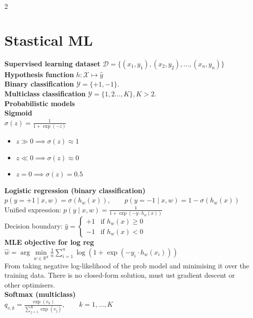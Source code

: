 \documentclass[10pt]{article}
\begin{document}
\small 

\raggedright

\begin{multicols*}{2}
\section*{Stastical ML}
\textbf{Supervised learning dataset}
$\mathcal{D} = \{(x_1, y_1), (x_2, y_2), \dots, (x_n, y_n)\}$\\
\textbf{Hypothesis function} $h : \mathcal{X} \mapsto \hat{y}$\\
\textbf{Binary classification} $\mathcal{Y} = \{+1,-1\}$.\\
\textbf{Multiclass classification} $\mathcal{Y} = \{1,2\ldots,K\},K>2$.\\
\vspace{1em}
\textbf{Probabilistic models}\\
\textbf{Sigmoid}\\
$\sigma(z) = \frac{1}{1 + \exp(-z)}$\\
\begin{itemize}
    \item $z\gg 0 \implies \sigma(z) \approx 1$
    \item $z \ll 0 \implies \sigma(z) \approx 0$
    \item $z = 0 \implies \sigma(z) = 0.5$
\end{itemize}
\textbf{Logistic regression (binary classification)}
$p(y = +1 \mid x, w) = \sigma(h_w(x)), \qquad p(y = -1 \mid x, w) = 1 - \sigma(h_w(x))$\\
Unified expression:
$p(y \mid x, w) = \frac{1}{1 + \exp(-y \cdot h_w(x))}$\\
Decision boundary: 
$\hat{y} = \begin{cases} +1 & \text{if } h_w(x) \geq 0 \\ -1 & \text{if } h_w(x) < 0 \end{cases}$\\
\textbf{MLE objective for log reg}
$\hat{w} = \arg\min\limits_{w \in \mathbb{R}^d} \frac{1}{n} \sum_{i=1}^{n} \log\!\left(1 + \exp(-y_i \cdot h_w(x_i))\right)$\\
From taking negative log-likelihood of the prob model and minimising it over the training data.
There is no closed-form solution, must ust gradient descent or other optimisers.\\
\medskip
\textbf{Softmax (multiclass)}\\
$q_{v,k} = \frac{\exp(v_k)}{\sum_{j=1}^{K} \exp(v_j)}, \qquad k = 1, \dots, K$\\

\end{multicols*}
\end{document}
